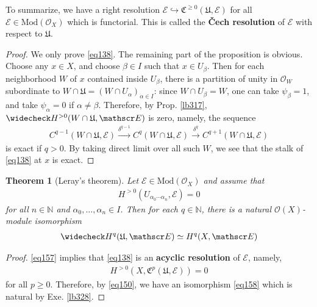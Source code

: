 \documentclass[12pt,b5paper,notitlepage]{report}
\theoremstyle{definition}
\theoremstyle{plain}
\newtheorem{thm}[df]{Theorem}
\newcommand{\fk}{\mathfrak}
\newcommand{\wch}{\widecheck}
\newcommand{\scr}{\mathscr}
\newcommand{\Nbb}{\mathbb N}
\newcommand{\Mod}{\mathrm{Mod}}
\numberwithin{equation}{section}
\begin{document}
To summarize, we have a right resolution $\scr E\hookrightarrow\fk C^{\geq 0}(\fk U,\scr E)$ for all $\scr E\in\Mod(\scr O_X)$ which is functorial. This is called the \textbf{\v Cech resolution}  of $\scr E$ with respect to $\fk U$.

\begin{proof}
We only prove \eqref{eq138}. The remaining part of the proposition is obvious. Choose any $x\in X$, and choose $\beta\in I$ such that $x\in U_\beta$. Then for each neighborhood $W$ of $x$ contained inside $U_\beta$, there is a partition of unity in $\scr O_W$ subordinate to $W\cap\fk U=(W\cap U_\alpha)_{\alpha\in I}$: since $W\cap U_\beta=W$, one can take $\psi_\beta=1$, and take $\psi_\alpha=0$ if $\alpha\neq\beta$. Therefore, by Prop. \ref{lb317}, $\wch H^{>0}(W\cap\fk U,\scr E)$ is zero, namely, the sequence
\begin{align*}
C^{q-1}(W\cap \fk U,\scr E)\xrightarrow{\delta^{q-1}}C^q(W\cap \fk U,\scr E)\xrightarrow{\delta^q}C^{q+1}(W\cap \fk U,\scr E)
\end{align*}
is exact if $q>0$. By taking direct limit over all such $W$, we see that the stalk of \eqref{eq138} at $x$ is exact.
\end{proof}






\begin{thm}[Leray's theorem]\label{lb327}
Let $\scr E\in\Mod(\scr O_X)$ and assume that
\begin{align}
H^{>0}(U_{\alpha_0\cdots\alpha_n},\scr E)=0  \label{eq157}
\end{align}
for all $n\in\Nbb$ and $\alpha_0,\dots,\alpha_n\in I$. Then for each $q\in\Nbb$, there is a natural $\scr O(X)$-module isomorphism
\begin{align}
\wch H^q(\fk U,\scr E)\simeq H^q(X,\scr E)    \label{eq158}
\end{align}
\end{thm}



\begin{proof}
\eqref{eq157} implies that \eqref{eq138} is an \textbf{acyclic resolution}   of $\scr E$, namely, 
\begin{align}
H^{>0}(X,\fk C^p(\fk U,\scr E))=0
\end{align}
for all $p\geq 0$. Therefore, by \eqref{eq150}, we have an isomorphism \eqref{eq158} which is natural by Exe. \ref{lb328}.
\end{proof}
\end{document}
